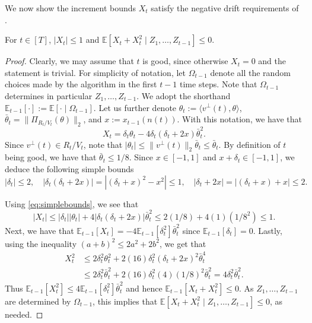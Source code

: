 \documentclass{toc}
\newcommand\E{\mathbb{E}}
\newcommand{\ip}[2]{\langle #1, #2 \rangle}
\begin{document}
We now show the increment bounds $X_t$ satisfy the negative drift
requirements of .

\begin{lemma}
\label{lem:inc-reqs}
For $t \in [T]$, $|X_t| \leq 1$ and $\E[X_t+X_t^2\mid Z_1,\ldots,Z_{t-1}] \leq 0$.
\end{lemma}

\begin{proof}
Clearly, we may assume that $t$ is good, since otherwise $X_t = 0$ and the statement
is trivial. For simplicity of notation, let $\Omega_{t-1}$ denote all the random choices made
by the algorithm in the first $t-1$ time steps. Note that $\Omega_{t-1}$ determines in particular $Z_1,\ldots,Z_{t-1}$.
We
%
adopt the    %
%
shorthand $\E_{t-1}[\cdot] := \E[\cdot\mid \Omega_{t-1}]$. Let us further denote
$\theta_t := \ip{v^\perp(t)}{\theta}$, $\bar{\theta}_t =
\|\Pi_{R_t/V_t}(\theta)\|_2$, and $x := x_{t-1}(n(t))$. With this notation, we
have that
\[
X_t = \delta_t \theta_t - 4 \delta_t(\delta_t+2x) \bar{\theta}_t^2.
\]
Since $v^\perp(t) \in R_t/V_t$, note that $|\theta_t| \leq \|v^\perp(t)\|_2
\bar{\theta}_t \leq \bar{\theta}_t$. By definition of $t$ being good, we have that $\bar{\theta}_t
\leq 1/8$. Since $x \in [-1,1]$ and $x+\delta_t \in [-1,1]$, we deduce the
following simple bounds
\begin{equation}\label{eq:simplebounds}
|\delta_t| \leq 2, \quad |\delta_t(\delta_t+2x)| = |(\delta_t+x)^2-x^2| \leq 1,
\quad |\delta_t+2x| = |(\delta_t+x) + x| \leq 2.
\end{equation}

Using \eqref{eq:simplebounds}, we see that
\[
|X_t| \leq |\delta_t||\theta_t| + 4|\delta_t(\delta_t+2x)|\bar{\theta}_t^2
      \leq 2(1/8) + 4(1)(1/8^2) \leq 1.
\]
Next, we have that $\E_{t-1}[X_t] = - 4 \E_{t-1}[\delta_t^2] \bar{\theta}_t^2$
since $\E_{t-1}[\delta_t] = 0$. Lastly, using the inequality $(a+b)^2 \leq
2a^2+2b^2$, we get that
\begin{align*}
X_t^2 &\leq 2 \delta_t^2 \theta_t^2 + 2(16)\delta_t^2(\delta_t+2x)^2  \bar{\theta}_t^4 \\
      &\leq 2 \delta_t^2 \bar{\theta}_t^2 + 2(16) \delta_t^2 (4)(1/8)^2 \bar{\theta}_t^2
      = 4 \delta_t^2 \bar{\theta}_t^2.
\end{align*}
Thus $\E_{t-1}[X_t^2] \le 4 \E_{t-1}[\delta_t^2] \bar{\theta}_t^2$ and hence
$\E_{t-1}[X_t+X_t^2] \le 0$. As $Z_1,\ldots,Z_{t-1}$ are determined by $\Omega_{t-1}$,
this implies that $\E[X_t+X_t^2\mid Z_1,\ldots,Z_{t-1}] \leq 0$, as needed.
\end{proof}
\end{document}
